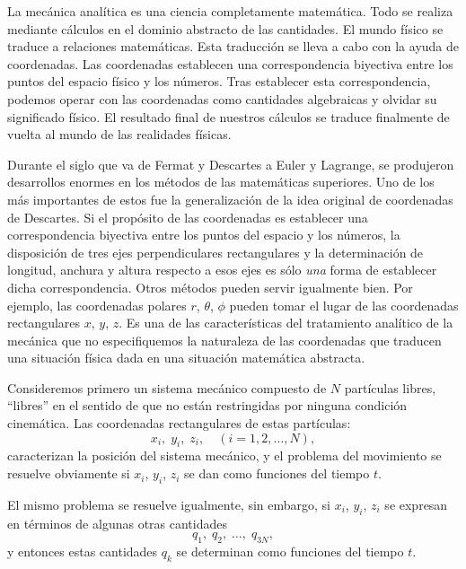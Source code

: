 \documentclass[12pt,a4paper]{book}
\begin{document}
La mec\'anica anal\'itica es una ciencia completamente matem\'atica. Todo se realiza mediante c\'alculos en el dominio abstracto de las cantidades. El mundo f\'isico se traduce a relaciones matem\'aticas. Esta traducci\'on se lleva a cabo con la ayuda de coordenadas. Las coordenadas establecen una correspondencia biyectiva entre los puntos del espacio f\'isico y los n\'umeros. Tras establecer esta correspondencia, podemos operar con las coordenadas como cantidades algebraicas y olvidar su significado f\'isico. El resultado final de nuestros c\'alculos se traduce finalmente de vuelta al mundo de las realidades f\'isicas.

Durante el siglo que va de Fermat y Descartes a Euler y Lagrange, se produjeron desarrollos enormes en los m\'etodos de las matem\'aticas superiores. Uno de los m\'as importantes de estos fue la generalizaci\'on de la idea original de coordenadas de Descartes. Si el prop\'osito de las coordenadas es establecer una correspondencia biyectiva entre los puntos del espacio y los n\'umeros, la disposici\'on de tres ejes perpendiculares rectangulares y la determinaci\'on de longitud, anchura y altura respecto a esos ejes es s\'olo \textit{una} forma de establecer dicha correspondencia. Otros m\'etodos pueden servir igualmente bien. Por ejemplo, las coordenadas polares $r$, $\theta$, $\phi$ pueden tomar el lugar de las coordenadas rectangulares $x$, $y$, $z$. Es una de las caracter\'isticas del tratamiento anal\'itico de la mec\'anica que no especifiquemos la naturaleza de las coordenadas que traducen una situaci\'on f\'isica dada en una situaci\'on matem\'atica abstracta.

Consideremos primero un sistema mec\'anico compuesto de $N$ part\'iculas libres, ``libres'' en el sentido de que no est\'an restringidas por ninguna condici\'on cinem\'atica. Las coordenadas rectangulares de estas part\'iculas:
\begin{equation}
x_i,\; y_i,\; z_i, \quad (i = 1, 2, \ldots, N),
\tag{12.1}
\end{equation}
caracterizan la posici\'on del sistema mec\'anico, y el problema del movimiento se resuelve obviamente si $x_i$, $y_i$, $z_i$ se dan como funciones del tiempo $t$.

El mismo problema se resuelve igualmente, sin embargo, si $x_i$, $y_i$, $z_i$ se expresan en t\'erminos de algunas otras cantidades
\begin{equation}
q_1,\; q_2,\; \ldots,\; q_{3N},
\tag{12.2}
\end{equation}
y entonces estas cantidades $q_k$ se determinan como funciones del tiempo $t$.
\end{document}
